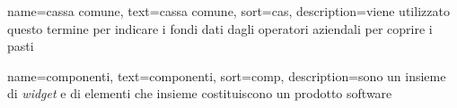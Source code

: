 %




%


 {
    name=cassa comune,
    text=cassa comune,
    sort=cas,
    description={viene utilizzato questo termine per indicare i fondi dati dagli operatori aziendali per coprire i pasti}
}

 {
    name=componenti,
    text=componenti,
    sort=comp,
    description={sono un insieme di \emph{widget} e di elementi che insieme costituiscono un prodotto software}
}

